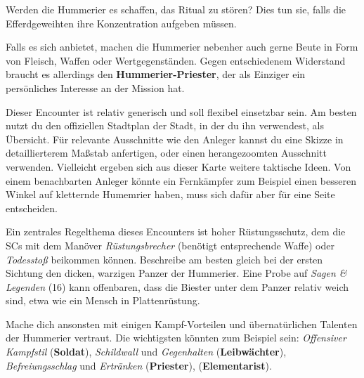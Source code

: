 Werden die Hummerier es schaffen, das Ritual zu stören? Dies tun sie, falls die Efferdgeweihten ihre Konzentration aufgeben müssen.

Falls es sich anbietet, machen die Hummerier nebenher auch gerne Beute in Form von Fleisch, Waffen oder Wertgegenständen. Gegen entschiedenem Widerstand braucht es allerdings den \textbf{Hummerier-Priester}, der als Einziger ein persönliches Interesse an der Mission hat.

Dieser Encounter ist relativ generisch und soll flexibel einsetzbar sein. Am besten nutzt du den offiziellen Stadtplan der Stadt, in der du ihn verwendest, als Übersicht.
Für relevante Ausschnitte wie den Anleger kannst du eine Skizze in detaillierterem Maßstab anfertigen, oder einen herangezoomten Ausschnitt verwenden.
Vielleicht ergeben sich aus dieser Karte weitere taktische Ideen. Von einem benachbarten Anleger könnte ein Fernkämpfer zum Beispiel einen besseren Winkel auf kletternde Humemrier haben, muss sich dafür aber für eine Seite entscheiden. 

Ein zentrales Regelthema dieses Encounters ist hoher Rüstungsschutz, dem die SCs mit dem Manöver \textit{Rüstungsbrecher} (benötigt entsprechende Waffe) oder \textit{Todesstoß} beikommen können.
Beschreibe am besten gleich bei der ersten Sichtung den dicken, warzigen Panzer der Hummerier. Eine Probe auf \textit{Sagen \& Legenden} (16) kann offenbaren, dass die Biester unter dem Panzer relativ weich sind, etwa wie ein Mensch in Plattenrüstung. 

Mache dich ansonsten mit einigen Kampf-Vorteilen und übernatürlichen Talenten der Hummerier vertraut. Die wichtigsten könnten zum Beispiel sein: \textit{Offensiver Kampfstil} (\textbf{Soldat}), \textit{Schildwall} und \textit{Gegenhalten} (\textbf{Leibwächter}), \textit{Befreiungsschlag} und \textit{Ertränken} (\textbf{Priester}),  (\textbf{Elementarist}). 

